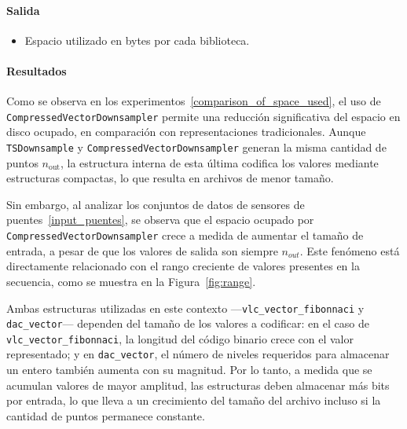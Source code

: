 \paragraph{Salida}
\begin{itemize}
    \item Espacio utilizado en bytes por cada biblioteca.
\end{itemize}

\newpage
\paragraph{Resultados}
\vspace{0.5em}
\noindent
\ComparisonOfSpaceUsed
\newpage

Como se observa en los experimentos~\ref{comparison_of_space_used}, el uso de \texttt{CompressedVectorDownsampler} permite una reducción significativa del espacio en disco ocupado, en comparación con representaciones tradicionales. Aunque \texttt{TSDownsample} y \texttt{CompressedVectorDownsampler} generan la misma cantidad de puntos \(n_{\text{out}}\), la estructura interna de esta última codifica los valores mediante estructuras compactas, lo que resulta en archivos de menor tamaño.

Sin embargo, al analizar los conjuntos de datos de sensores de puentes~\ref{input_puentes}, se observa que el espacio ocupado por \texttt{CompressedVectorDownsampler} crece a medida de aumentar el tamaño de entrada, a pesar de que los valores de salida son siempre $n_{out}$. Este fenómeno está directamente relacionado con el rango creciente de valores presentes en la secuencia, como se muestra en la Figura~\ref{fig:range}.

Ambas estructuras utilizadas en este contexto —\texttt{vlc\_vector\_fibonnaci} y \texttt{dac\_vector}— dependen del tamaño de los valores a codificar: en el caso de \texttt{vlc\_vector\_fibonnaci}, la longitud del código binario crece con el valor representado; y en \texttt{dac\_vector}, el número de niveles requeridos para almacenar un entero también aumenta con su magnitud. Por lo tanto, a medida que se acumulan valores de mayor amplitud, las estructuras deben almacenar más bits por entrada, lo que lleva a un crecimiento del tamaño del archivo incluso si la cantidad de puntos permanece constante.

